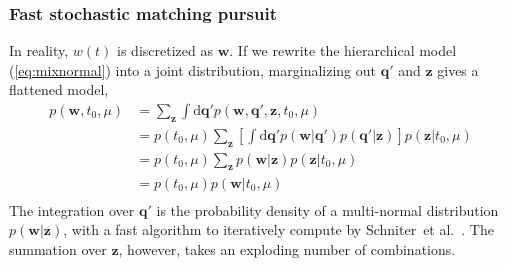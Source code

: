 \subsubsection{Fast stochastic matching pursuit}
\label{subsec:fsmp}
In reality, $w(t)$ is discretized as $\bm{w}$. If we rewrite the hierarchical model (\ref{eq:mixnormal}) into a joint distribution, marginalizing out $\bm{q}'$ and $\bm{z}$ gives a flattened model,
\begin{equation}
  \label{eq:universe}
  \begin{aligned}
    p(\bm{w}, t_0, \mu) &= \sum_{\bm{z}} \int \mathrm{d}\bm{q}' p(\bm{w}, \bm{q}', \bm{z}, t_0, \mu) \\
    &= p(t_0, \mu) \sum_{\bm{z}} \left[\int \mathrm{d}\bm{q}' p(\bm{w}|\bm{q}') p(\bm{q}'|\bm{z}) \right] p(\bm{z}|t_0, \mu) \\
    &= p(t_0, \mu) \sum_{\bm{z}} p(\bm{w}|\bm{z}) p(\bm{z}|t_0, \mu) \\
    &= p(t_0, \mu) p(\bm{w}|t_0, \mu) \\
  \end{aligned}
\end{equation}
The integration over $\bm{q}'$ is the probability density of a multi-normal distribution $p(\bm{w}|\bm{z})$, with a fast algorithm to iteratively compute by Schniter~et al.~\cite{schniter_fast_2008}. The summation over $\bm{z}$, however, takes an exploding number of combinations.

